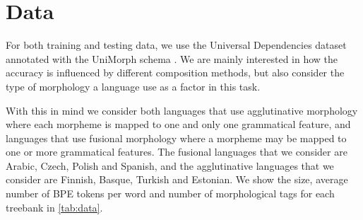 \documentclass[11pt]{article}
\newcommand\jp[1]{(\textbf{JP:} #1)}
\newcommand\citep{\cite}
\begin{document}
    \section{Data}
    
            For both training and testing data, we use the Universal
     Dependencies dataset \citep{nivre2018} annotated with the
     UniMorph schema \citep{mccarthy2018marrying}.  We are mainly
     interested in how the accuracy is influenced by different
     composition methods, but also consider the type of morphology a
     language use as a factor in this task.
    
%
    With this in mind we consider both
     languages that use agglutinative morphology where each morpheme
     is mapped to one and only one grammatical feature, and
     languages that use fusional morphology where a morpheme may be
     mapped to one or more grammatical features. 
%
%
           	The fusional languages that we consider are Arabic, Czech,
     Polish and Spanish, and the agglutinative languages that we
     consider are Finnish, Basque, Turkish and Estonian.  We show the
     size, average number of BPE tokens per word and number of
     morphological tags for each treebank in \cref{tab:data}.
    

    
    
\end{document}
